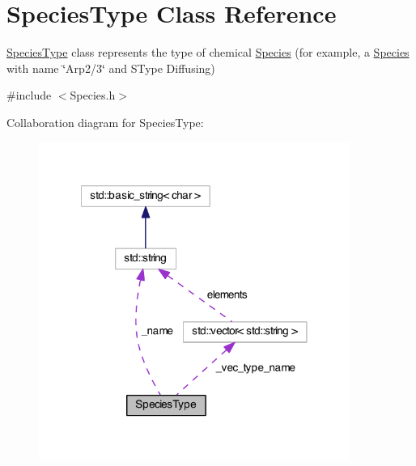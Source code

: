 \hypertarget{classSpeciesType}{\section{Species\-Type Class Reference}
\label{classSpeciesType}
}


\hyperlink{classSpeciesType}{Species\-Type} class represents the type of chemical \hyperlink{classSpecies}{Species} (for example, a \hyperlink{classSpecies}{Species} with name \char`\"{}\-Arp2/3\char`\"{} and S\-Type Diffusing)  




{\ttfamily \#include $<$Species.\-h$>$}



Collaboration diagram for Species\-Type\-:\nopagebreak
\begin{figure}[H]
\begin{center}
\leavevmode
\includegraphics[width=288pt]{classSpeciesType__coll__graph}
\end{center}
\end{figure}
